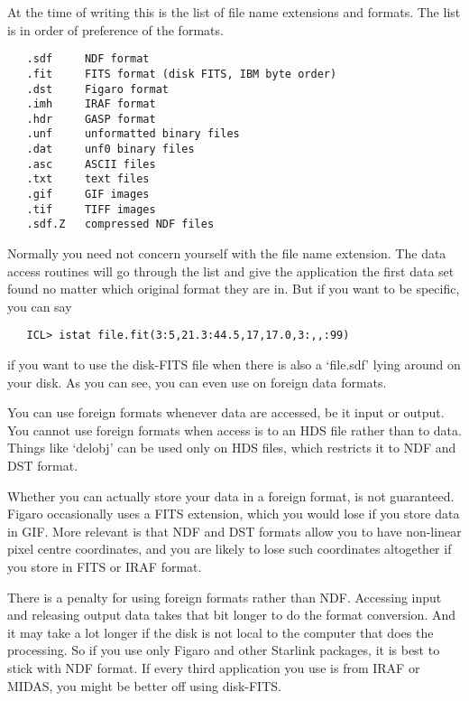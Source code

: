   At the time of writing this is the list of file name extensions and
   formats. The list is in order of preference of the formats.

\begin{verbatim}
   .sdf     NDF format
   .fit     FITS format (disk FITS, IBM byte order)
   .dst     Figaro format
   .imh     IRAF format
   .hdr     GASP format
   .unf     unformatted binary files
   .dat     unf0 binary files
   .asc     ASCII files
   .txt     text files
   .gif     GIF images
   .tif     TIFF images
   .sdf.Z   compressed NDF files
\end{verbatim}

   Normally you need not concern yourself with the file name
   extension. The data access routines will go through the list and
   give the application the first data set found no matter which
   original format they are in. But if you want to be specific, you
   can say

\begin{verbatim}
   ICL> istat file.fit(3:5,21.3:44.5,17,17.0,3:,,:99)
\end{verbatim}

   if you want to use the disk-FITS file when there is also a
   `file.sdf' lying around on your disk. As you can see, you can even
   use  on foreign data formats.

   You can use foreign formats whenever data are accessed, be it input
   or output. You cannot use foreign formats when access is to an HDS
   file rather than to data. Things like `delobj' can be used only on
   HDS files, which restricts it to NDF and DST format.

   Whether you can actually store your data in a foreign format, is
   not guaranteed. Figaro occasionally uses a FITS extension, which you
   would lose if you store data in GIF. More relevant is that NDF and
   DST formats allow you to have non-linear pixel centre coordinates,
   and you are likely to lose such coordinates altogether if you store
   in FITS or IRAF format.

   There is a penalty for using foreign formats rather than NDF.
   Accessing input and releasing output data takes that bit longer to
   do the format conversion. And it may take a lot longer if the disk
   is not local to the computer that does the processing. So if you
   use only Figaro and other Starlink packages, it is best to stick
   with NDF format. If every third application you use is from IRAF
   or MIDAS, you might be better off using disk-FITS.


